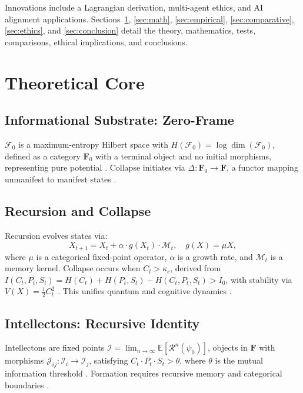 \documentclass[11pt]{article}
\newcommand{\field}[1]{\mathcal{#1}}
\newcommand{\intellecton}{\mathcal{I}} %
\newcommand{\expect}{\mathbb{E}}
\newcommand{\cat}[1]{\mathbf{#1}} %
\begin{document}
Innovations include a Lagrangian derivation, multi-agent ethics, and AI alignment applications. Sections~\ref{sec:theory}, \ref{sec:math}, \ref{sec:empirical}, \ref{sec:comparative}, \ref{sec:ethics}, and \ref{sec:conclusion} detail the theory, mathematics, tests, comparisons, ethical implications, and conclusions.

\section{Theoretical Core}
\label{sec:theory}

\subsection{Informational Substrate: Zero-Frame}
$\field{F}_0$ is a maximum-entropy Hilbert space with $H(\field{F}_0) = \log \dim(\field{F}_0)$, defined as a category $\cat{F}_0$ with a terminal object and no initial morphisms, representing pure potential \citep{zurek2003, plotinus2020}. Collapse initiates via $\Delta: \cat{F}_0 \to \cat{F}$, a functor mapping unmanifest to manifest states \citep{wolfram2020}.

\subsection{Recursion and Collapse}
Recursion evolves states via:
\begin{equation}
X_{t+1} = X_t + \alpha \cdot g(X_t) \cdot \mathcal{M}_t, \quad g(X) = \mu X,
\label{eq:recursion}
\end{equation}
where $\mu$ is a categorical fixed-point operator, $\alpha$ is a growth rate, and $\mathcal{M}_t$ is a memory kernel. Collapse occurs when $C_t > \kappa_c$, derived from $I(C_t, P_t, S_t) = H(C_t) + H(P_t, S_t) - H(C_t, P_t, S_t) > I_0$, with stability via $V(X) = \frac{1}{2} C_t^2$ \citep{penrose2024}. This unifies quantum \citep{rovelli2023} and cognitive dynamics \citep{baars2023}.

\subsection{Intellectons: Recursive Identity}
Intellectons are fixed points $\intellecton = \lim_{n \to \infty} \expect[\mathcal{R}^n(\psi_0)]$, objects in $\cat{F}$ with morphisms $\mathcal{J}_{ij}: \intellecton_i \to \intellecton_j$, satisfying $C_t \cdot P_t \cdot S_t > \theta$, where $\theta$ is the mutual information threshold \citep{tononi2023, levin2024}. Formation requires recursive memory and categorical boundaries \citep{hofstadter1979}.
\end{document}
